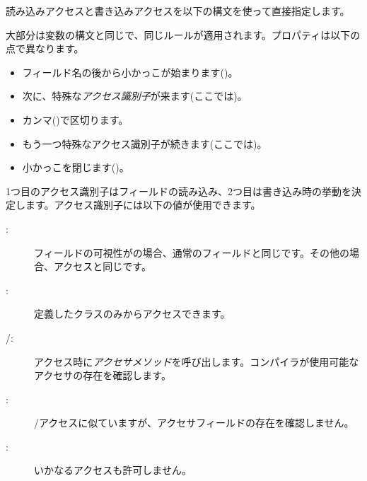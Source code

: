 
読み込みアクセスと書き込みアクセスを以下の構文を使って直接指定します。


大部分は変数の構文と同じで、同じルールが適用されます。プロパティは以下の点で異なります。

\begin{itemize}
	\item フィールド名の後から小かっこが始まります(\expr{(})。
	\item 次に、特殊な\emph{アクセス識別子}が来ます(ここでは)。
	\item カンマ(\expr{,})で区切ります。
	\item もう一つ特殊なアクセス識別子が続きます(ここでは)。
	\item 小かっこを閉じます(\expr{)})。
\end{itemize}

1つ目のアクセス識別子はフィールドの読み込み、2つ目は書き込み時の挙動を決定します。アクセス識別子には以下の値が使用できます。

\begin{description}
	\item[:] フィールドの可視性がの場合、通常のフィールドと同じです。その他の場合、アクセスと同じです。
	\item[:] 定義したクラスのみからアクセスできます。
	\item[/:] アクセス時に\emph{アクセサメソッド}を呼び出します。コンパイラが使用可能なアクセサの存在を確認します。
	\item[:] /アクセスに似ていますが、アクセサフィールドの存在を確認しません。
	\item[:] いかなるアクセスも許可しません。
\end{description}


